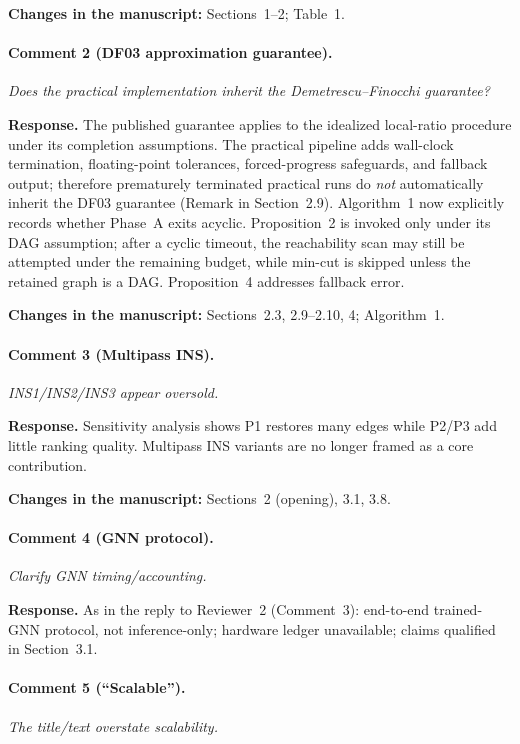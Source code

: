 \documentclass[11pt]{article}
\newcommand{\commentbox}[1]{\par\textit{#1}\par\medskip}
\newcommand{\changes}[1]{\textbf{Changes in the manuscript:} #1\par\medskip}
\begin{document}
\changes{Sections~1--2; Table~1.}

\paragraph{Comment 2 (DF03 approximation guarantee).}
\commentbox{Does the practical implementation inherit the Demetrescu--Finocchi guarantee?}

\noindent\textbf{Response.}
The published guarantee applies to the idealized local-ratio procedure under its completion assumptions. The practical pipeline adds wall-clock termination, floating-point tolerances, forced-progress safeguards, and fallback output; therefore prematurely terminated practical runs do \emph{not} automatically inherit the DF03 guarantee (Remark in Section~2.9). Algorithm~1 now explicitly records whether Phase~A exits acyclic. Proposition~2 is invoked only under its DAG assumption; after a cyclic timeout, the reachability scan may still be attempted under the remaining budget, while min-cut is skipped unless the retained graph is a DAG. Proposition~4 addresses fallback error.

\changes{Sections~2.3, 2.9--2.10, 4; Algorithm~1.}

\paragraph{Comment 3 (Multipass INS).}
\commentbox{INS1/INS2/INS3 appear oversold.}

\noindent\textbf{Response.}
Sensitivity analysis shows P1 restores many edges while P2/P3 add little ranking quality. Multipass INS variants are no longer framed as a core contribution.

\changes{Sections~2 (opening), 3.1, 3.8.}

\paragraph{Comment 4 (GNN protocol).}
\commentbox{Clarify GNN timing/accounting.}

\noindent\textbf{Response.}
As in the reply to Reviewer~2 (Comment~3): end-to-end trained-GNN protocol, not inference-only; hardware ledger unavailable; claims qualified in Section~3.1.

\paragraph{Comment 5 (``Scalable'').}
\commentbox{The title/text overstate scalability.}
\end{document}
